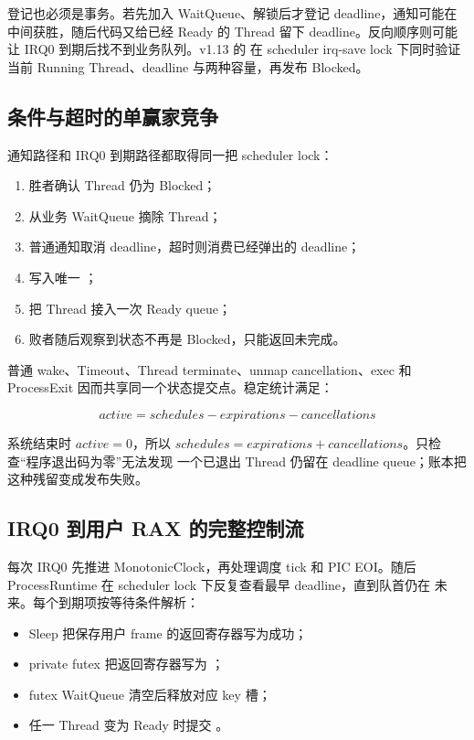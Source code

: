 登记也必须是事务。若先加入 WaitQueue、解锁后才登记 deadline，通知可能在
中间获胜，随后代码又给已经 Ready 的 Thread 留下 deadline。反向顺序则可能
让 IRQ0 到期后找不到业务队列。v1.13 的
 在 scheduler irq-save lock 下同时验证当前
Running Thread、deadline 与两种容量，再发布 Blocked。

\subsection{条件与超时的单赢家竞争}

通知路径和 IRQ0 到期路径都取得同一把 scheduler lock：

\begin{enumerate}
  \item 胜者确认 Thread 仍为 Blocked；
  \item 从业务 WaitQueue 摘除 Thread；
  \item 普通通知取消 deadline，超时则消费已经弹出的 deadline；
  \item 写入唯一 ；
  \item 把 Thread 接入一次 Ready queue；
  \item 败者随后观察到状态不再是 Blocked，只能返回未完成。
\end{enumerate}

普通 wake、Timeout、Thread terminate、unmap cancellation、exec 和
ProcessExit 因而共享同一个状态提交点。稳定统计满足：

\[
active=schedules-expirations-cancellations
\]

系统结束时 \(active=0\)，所以
\(schedules=expirations+cancellations\)。只检查“程序退出码为零”无法发现
一个已退出 Thread 仍留在 deadline queue；账本把这种残留变成发布失败。

\subsection{IRQ0 到用户 RAX 的完整控制流}

每次 IRQ0 先推进 MonotonicClock，再处理调度 tick 和 PIC EOI。随后
ProcessRuntime 在 scheduler lock 下反复查看最早 deadline，直到队首仍在
未来。每个到期项按等待条件解析：

\begin{itemize}
  \item Sleep 把保存用户 frame 的返回寄存器写为成功；
  \item private futex 把返回寄存器写为 ；
  \item futex WaitQueue 清空后释放对应 key 槽；
  \item 任一 Thread 变为 Ready 时提交 。
\end{itemize}

